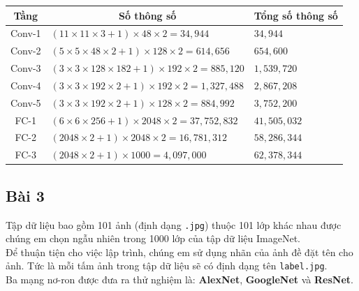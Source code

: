 \documentclass[a4paper]{article}
\begin{document}
\begin{table}[!h]
\centering
{\renewcommand{\arraystretch}{1.8}
\begin{tabular}{|c|l|l|}
\hline
\textbf{Tầng} & \multicolumn{1}{c|}{\textbf{Số thông số}} & \multicolumn{1}{c|}{\textbf{Tổng số thông số}}\\ \hline
Conv-1 & $(11 \times 11 \times 3 + 1)\times 48 \times 2 = 34,944$ & $34,944$ \\\hline
Conv-2 & $(5 \times 5 \times 48 \times 2 + 1)\times 128 \times 2 = 614,656$ & $654,600$ \\ \hline
Conv-3 & $(3 \times 3 \times 128 \times 182 + 1)\times 192 \times 2 = 885,120$ & $1,539,720$ \\ \hline
Conv-4 & $(3 \times 3 \times 192 \times 2 + 1)\times 192 \times 2 = 1,327,488$ & $2,867,208$ \\ \hline
Conv-5 & $(3 \times 3 \times 192 \times 2 + 1)\times 128 \times 2 = 884,992$ & $3,752,200$ \\ \hline
FC-1 & $(6 \times 6 \times 256 + 1)\times 2048 \times 2 = 37,752,832$ & $41,505,032$ \\ \hline
FC-2 & $(2048 \times 2 + 1)\times 2048 \times 2 = 16,781,312$ & $58,286,344$ \\ \hline
FC-3 & $(2048 \times 2 + 1)\times 1000 = 4,097,000$ & $62,378,344$ \\ \hline
\end{tabular}} \quad
\end{table}

\subsection{Bài 3}\label{bai3}
Tập dữ liệu bao gồm 101 ảnh (định dạng \texttt{.jpg}) thuộc 101 lớp khác nhau được chúng em chọn ngẫu nhiên trong 1000 lớp của tập dữ liệu ImageNet.\\
Để thuận tiện cho việc lập trình, chúng em sử dụng nhãn của ảnh đề đặt tên cho ảnh. Tức là mỗi tấm ảnh trong tập dữ liệu sẽ có định dạng tên \texttt{label.jpg}.\\
Ba mạng nơ-ron được đưa ra thử nghiệm là: \textbf{AlexNet}, \textbf{GoogleNet} và \textbf{ResNet}.
\end{document}
